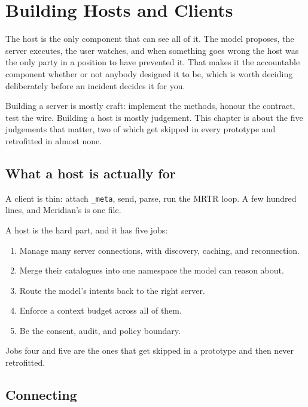\chapter{Building Hosts and Clients}
\label{ch:building-hosts}

The host is the only component that can see all of it. The model proposes, the
server executes, the user watches, and when something goes wrong the host was
the only party in a position to have prevented it. That makes it the accountable component whether or not anybody designed it to
be, which is worth deciding deliberately before an incident decides it for you.

Building a server is mostly craft: implement the methods, honour the contract,
test the wire. Building a host is mostly judgement. This chapter is about the
five judgements that matter, two of which get skipped in every prototype and
retrofitted in almost none.

\section{What a host is actually for}

A client is thin: attach \texttt{\_meta}, send, parse, run the MRTR loop. A few
hundred lines, and Meridian's is one file.

A host is the hard part, and it has five jobs:

\begin{enumerate}[leftmargin=1.6em, itemsep=3pt]
\item Manage many server connections, with discovery, caching, and reconnection.
\item Merge their catalogues into one namespace the model can reason about.
\item Route the model's intents back to the right server.
\item Enforce a context budget across all of them.
\item Be the consent, audit, and policy boundary.
\end{enumerate}

Jobs four and five are the ones that get skipped in a prototype and then never
retrofitted.


\section{Connecting}

